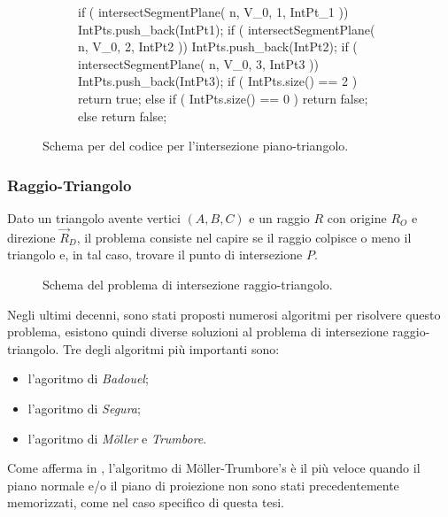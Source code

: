 \begin{figure}[htbp]
	\centering
	\begin{subfigure}{.7\linewidth}
		\begin{pseudoc}
	if ( intersectSegmentPlane( n, V_0, 1, IntPt_1 ))
	{ IntPts.push_back(IntPt1); }
	if ( intersectSegmentPlane( n, V_0, 2, IntPt2 ))
	{ IntPts.push_back(IntPt2); }
	if ( intersectSegmentPlane( n, V_0, 3, IntPt3 ))
	{ IntPts.push_back(IntPt3); }
	if ( IntPts.size() == 2 ) 
	{ return true; }
	else if ( IntPts.size() == 0 ) 
	{ return false; }
	else 
	{ return false; }
		\end{pseudoc}
	\end{subfigure}
	\caption{Schema per del codice per l'intersezione piano-triangolo.}
\end{figure}
%
\subsubsection{Raggio-Triangolo}
Dato un triangolo avente vertici $(A,B,C)$ e un raggio $R$ con origine $R_O$ e direzione $\vec{R}_D$, il problema consiste nel capire se il raggio colpisce o meno il triangolo e, in tal caso, trovare il punto di intersezione $P$.
%
\begin{figure}[htbp]
	\centering
	\caption{Schema del problema di intersezione raggio-triangolo.}
\end{figure}
%
Negli ultimi decenni, sono stati proposti numerosi algoritmi per risolvere questo problema, esistono quindi diverse soluzioni al problema di intersezione raggio-triangolo. Tre degli algoritmi più importanti sono:
\begin{itemize}
	\item l'agoritmo di \textit{Badouel};
	\item l'agoritmo di \textit{Segura};
	\item l'agoritmo di \textit{M\"oller} e \textit{Trumbore}.
\end{itemize}
\noindent
Come \citeauthor{RayTriangle} afferma in \cite{RayTriangle}, l'algoritmo di M\"oller-Trumbore's è il più veloce quando il piano normale e/o il piano di proiezione non sono stati precedentemente memorizzati, come nel caso specifico di questa tesi.

